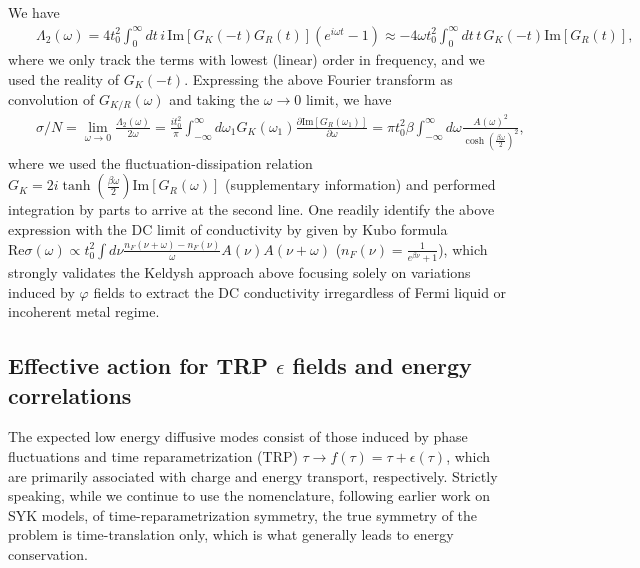\documentclass[twocolumn,floatfix,superscriptaddress]{revtex4-1}
\begin{document}
\begin{widetext}
We have
\begin{eqnarray}
\label{s2}
&&\Lambda_2(\omega)=4t_0^2\int_0^{\infty}\! dt\,  i\, \text{Im}[G_K(-t)G_R(t)](e^{i\omega t}-1)\approx -4\omega t_0^2\int_0^{\infty} \! dt\,  t\,  G_K(-t)\text{Im}[G_R(t)],
 \end{eqnarray}
where we only track the terms with lowest (linear) order in frequency, and we used the reality of $G_K(-t)$.  Expressing the above Fourier transform as convolution of $G_{K/R}(\omega)$ and taking the $\omega\rightarrow 0$ limit, we have 
\begin{eqnarray}
&&\sigma/N=\lim_{\omega\rightarrow 0}\frac{\Lambda_2(\omega)}{2\omega}= \frac{it_0^2}{\pi}\int_{-\infty}^{\infty}d\omega_1 G_K(\omega_1)\frac{\partial{\text{Im}[G_R(\omega_1)]}}{\partial \omega}=\pi t_0^2\beta\int_{-\infty}^{\infty} d\omega \frac{A(\omega)^2}{\cosh(\frac{\beta\omega}{2})^2},
\end{eqnarray}
where we used the fluctuation-dissipation relation $G_K=2i\tanh(\frac{\beta\omega}{2})\text{Im}[G_R(\omega)]$ (supplementary information) and performed integration by parts to arrive at the second line. One readily identify the above expression with the DC limit of conductivity by given by Kubo formula \cite{georges_1996} $\text{Re}\sigma(\omega)\propto t_0^2\int d\nu \frac{n_F(\nu+\omega)-n_F(\nu)}{\omega}A(\nu)A(\nu+\omega)$ ($n_F(\nu)=\frac{1}{e^{\beta\nu}+1}$), which strongly validates the Keldysh approach above focusing solely on variations induced by $\varphi$ fields to extract the DC conductivity irregardless of Fermi liquid or incoherent metal regime.

\subsection{Effective action for TRP $\epsilon$ fields and energy correlations}
The expected low energy diffusive modes consist of those induced by phase fluctuations and time reparametrization (TRP) $\tau\rightarrow f(\tau)=\tau+\epsilon(\tau)$, which are primarily associated with charge and energy transport, respectively.   Strictly speaking, while we continue to use the nomenclature, following earlier work on SYK models, of time-reparametrization symmetry, the true symmetry of the problem is time-translation only, which is what generally leads to energy conservation.    


\end{widetext}
\end{document}
